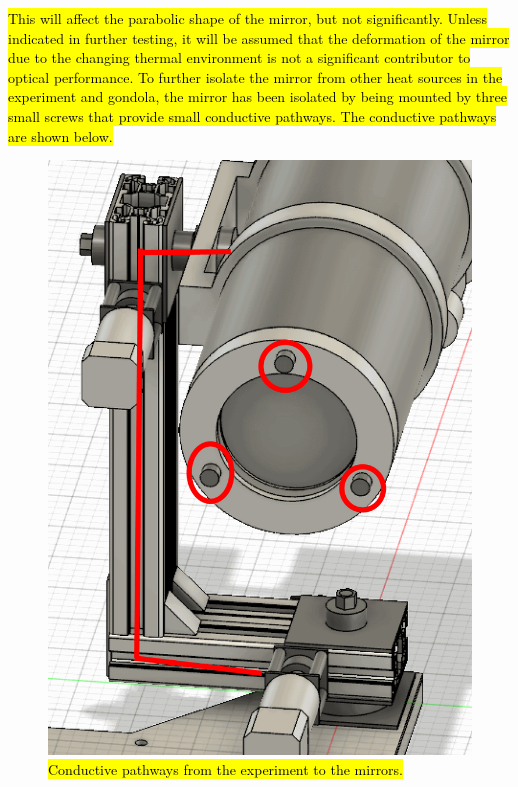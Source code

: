 \hl{This will affect the parabolic shape of the mirror, but not significantly. Unless indicated in further testing, it will be assumed that the deformation of the mirror due to the changing thermal environment is not a significant contributor to optical performance. To further isolate the mirror from other heat sources in the experiment and gondola, the mirror has been isolated by being mounted by three small screws that provide small conductive pathways. The conductive pathways are shown below.} \\

	\begin{figure}[H]
    \centering	
	\includegraphics[scale=0.5]{4-experiment-design/img/mechanical/thermalpaths.PNG}
	\caption{\hl{Conductive pathways from the experiment to the mirrors.}}
	\label{fig:thermalpaths}
    	\end{figure}


